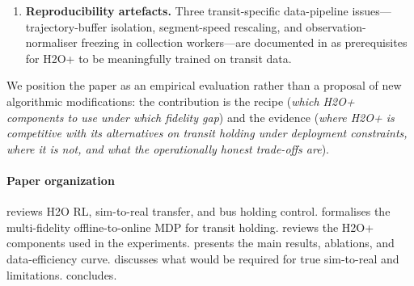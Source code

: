 \begin{enumerate}
    \item \textbf{Reproducibility artefacts.} Three transit-specific data-pipeline issues---trajectory-buffer isolation, segment-speed rescaling, and observation-normaliser freezing in collection workers---are documented in  as prerequisites for H2O+ to be meaningfully trained on transit data.
\end{enumerate}
We position the paper as an empirical evaluation rather than a proposal of new algorithmic modifications: the contribution is the recipe (\emph{which H2O+ components to use under which fidelity gap}) and the evidence (\emph{where H2O+ is competitive with its alternatives on transit holding under deployment constraints, where it is not, and what the operationally honest trade-offs are}).

\paragraph{Paper organization}
 reviews H2O RL, sim-to-real transfer, and bus holding control.
 formalises the multi-fidelity offline-to-online MDP for transit holding.
 reviews the H2O+ components used in the experiments.
 presents the main results, ablations, and data-efficiency curve.
 discusses what would be required for true sim-to-real and limitations.
 concludes.
